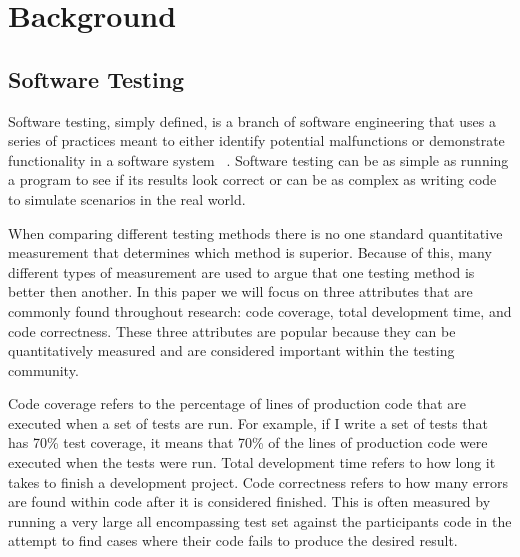 \documentclass{sig-alternate}
\begin{document}
\section{Background}
\subsection{Software Testing}
Software testing, simply defined, is a branch of software engineering that uses a series of practices meant to either identify potential malfunctions or demonstrate functionality in a software system ~\cite{Bertolino:2007}.  Software testing can be as simple as running a program to see if its results look correct or can be as complex as writing code to simulate scenarios in the real world.

When comparing different testing methods there is no one standard quantitative measurement that determines which method is superior.  Because of this, many different types of measurement are used to argue that one testing method is better then another.  In this paper we will focus on three attributes that are commonly found throughout research: code coverage, total development time, and code correctness.   These three attributes are popular because they can be quantitatively measured and are considered important within the testing community.

Code coverage refers to the percentage of lines of production code that are executed when a set of tests are run. For example, if I write a set of tests that has 70\% test coverage, it means that 70\% of the lines of production code were executed when the tests were run.  Total development time refers to how long it takes to finish a development project.  Code correctness refers to how many errors are found within code after it is considered finished.  This is often measured by running a very large all encompassing test set against the participants code in the attempt to find cases where their code fails to produce the desired result. 
\end{document}

